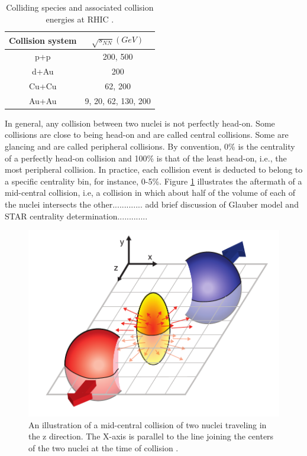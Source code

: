 \begin{table}[h!]
\centering
\begin{tabular}{||c c||}
\hline
Collision system & $\sqrt{s_{NN}}(GeV)$ \\ [0.5ex]
\hline
\hline
p+p & 200, 500 \\
d+Au & 200 \\
Cu+Cu & 62, 200 \\
Au+Au & 9, 20, 62, 130, 200 \\ [1ex]
\hline
\end{tabular}
\caption{Colliding species and associated collision energies at RHIC \cite{phdthesisnattrass}.}
\label{table:RHIC_specs}
\end{table}


In general, any collision between two nuclei is not perfectly head-on. Some collisions are close to being head-on and are called central collisions. Some are glancing and are called peripheral collisions. %
By convention, 0\% is the centrality of a perfectly head-on collision and 100\% is that of the least head-on, i.e., the most peripheral collision. In practice, each collision event is deducted to belong to a specific centrality bin, for instance, 0-5\%. Figure \ref{fig:mid-central_collision} illustrates the aftermath of a mid-central collision, i.e, a collision in which about half of the volume of each of the nuclei intersects the other............. add brief discussion of Glauber model and STAR centrality determination.............
	\begin{figure}[h]
	  \centering
	  \includegraphics[width=4.5in]{figures/flow_elliptic_init_v4.pdf}
	  \caption{An illustration of a mid-central collision of two nuclei traveling in the z direction. The X-axis is parallel to the line joining the centers of the two nuclei at the time of collision \cite{Connors:2017ptx}.}\label{fig:mid-central_collision}
	\end{figure}

